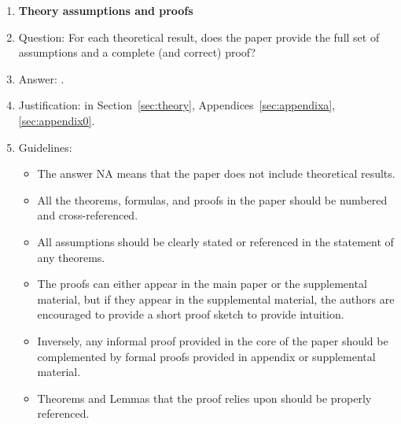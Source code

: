 \documentclass{article}
\begin{document}
{\begin{enumerate}
\item {\bf Theory assumptions and proofs}
    \item[] Question: For each theoretical result, does the paper provide the full set of assumptions and a complete (and correct) proof?
    \item[] Answer: \answerYes{}.
    \item[] Justification: in Section~\ref{sec:theory}, Appendices~\ref{sec:appendixa}, \ref{sec:appendix0}.
    \item[] Guidelines:
    \begin{itemize}
        \item The answer NA means that the paper does not include theoretical results. 
        \item All the theorems, formulas, and proofs in the paper should be numbered and cross-referenced.
        \item All assumptions should be clearly stated or referenced in the statement of any theorems.
        \item The proofs can either appear in the main paper or the supplemental material, but if they appear in the supplemental material, the authors are encouraged to provide a short proof sketch to provide intuition. 
        \item Inversely, any informal proof provided in the core of the paper should be complemented by formal proofs provided in appendix or supplemental material.
        \item Theorems and Lemmas that the proof relies upon should be properly referenced. 
    \end{itemize}


\end{enumerate}}
\end{document}

